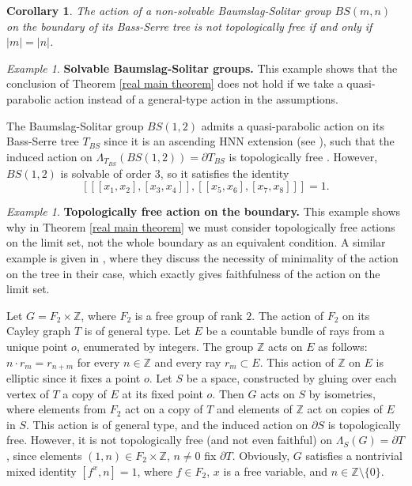 \documentclass[11pt,letterpaper]{article}
\newcommand{\ZZ}{\mathbb{Z}}
\newtheorem{cor}[thm]{Corollary}
\theoremstyle{definition}
\theoremstyle{remark}
\newtheorem{ex}[thm]{Example}
\begin{document}
\begin{cor}
The action of a non-solvable Baumslag-Solitar group $BS(m,n)$ on the boundary of its Bass-Serre tree is not topologically free if and only if $|m|=|n|$.
\end{cor}

\begin{ex}
{\bf Solvable Baumslag-Solitar groups.}
This example shows that the conclusion of Theorem \ref{real main theorem} does not hold if we take a quasi-parabolic action instead of a general-type action in the assumptions.

The Baumslag-Solitar group $BS(1,2)$ admits a quasi-parabolic action on its Bass-Serre tree $T_{BS}$ since it is an ascending HNN extension (see \cite[Section 2.5]{FMMS}), such that the induced action on $\Lambda_{T_{BS}}(BS(1,2))=\partial T_{BS}$ is topologically free \cite[Lemma 8.6]{FMMS}. However, $BS(1,2)$ is solvable of order $3$, so it satisfies the identity $$
[[[x_1,x_2],[x_3,x_4]],[[x_5,x_6],[x_7,x_8]]]=1 .
$$
\end{ex}

\begin{ex}
{\bf Topologically free action on the boundary.} This example shows why in Theorem \ref{real main theorem} we must consider topologically free actions on the limit set, not the whole boundary as an equivalent condition. A similar example is given in \cite[Proposition 9.2]{FMMS}, where they discuss the necessity of minimality of the action on the tree in their case, which exactly gives faithfulness of the action on the limit set.

Let $G = F_2 \times \ZZ$, where $F_2$ is a free group of rank $2$. The action of $F_2$ on its Cayley graph $T$ is of general type. Let $E$ be a countable bundle of rays from a unique point $o$, enumerated by integers. The group $\ZZ$ acts on $E$ as follows: $n\cdot r_m = r_{n+m}$ for every $n \in \ZZ$ and every ray $r_m \subset E$. This action of $\ZZ$ on $E$ is elliptic since it fixes a point $o$. Let $S$ be a space, constructed by gluing over each vertex of $T$ a copy of $E$ at its fixed point $o$. Then $G$ acts on $S$ by isometries, where elements from $F_2$ act on a copy of $T$ and elements of $\ZZ$ act on copies of $E$ in $S$. This action is of general type, and the induced action on $\partial S$ is topologically free. However, it is not topologically free (and not even faithful) on $\Lambda_S(G) = \partial T$, since elements $(1, n) \in F_2 \times \ZZ$, $n\neq 0$ fix $\partial T$. Obviously, $G$ satisfies a nontrivial mixed identity $[f^x, n]=1$, where $f \in F_2$, $x$ is a free variable, and $n \in \ZZ\setminus\{0\}$.  
\end{ex}
\end{document}
